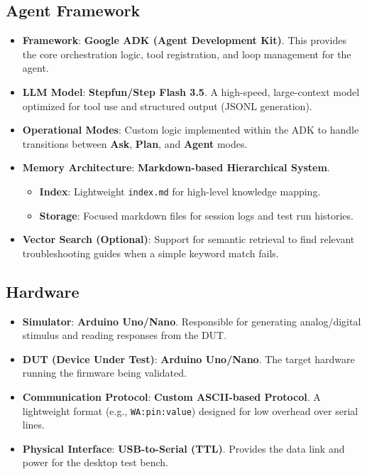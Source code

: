 \documentclass[conference]{IEEEtran}
\begin{document}
\subsection{Agent Framework}
\begin{itemize}
    \item \textbf{Framework}: \textbf{Google ADK (Agent Development Kit)}. This provides the core orchestration logic, tool registration, and loop management for the agent.
    \item \textbf{LLM Model}: \textbf{Stepfun/Step Flash 3.5}. A high-speed, large-context model optimized for tool use and structured output (JSONL generation).
    \item \textbf{Operational Modes}: Custom logic implemented within the ADK to handle transitions between \textbf{Ask}, \textbf{Plan}, and \textbf{Agent} modes.
    \item \textbf{Memory Architecture}: \textbf{Markdown-based Hierarchical System}.
    \begin{itemize}
        \item \textbf{Index}: Lightweight \texttt{index.md} for high-level knowledge mapping.
        \item \textbf{Storage}: Focused markdown files for session logs and test run histories.
    \end{itemize}
    \item \textbf{Vector Search (Optional)}: Support for semantic retrieval to find relevant troubleshooting guides when a simple keyword match fails.
\end{itemize}

\subsection{Hardware}
\begin{itemize}
    \item \textbf{Simulator}: \textbf{Arduino Uno/Nano}. Responsible for generating analog/digital stimulus and reading responses from the DUT.
    \item \textbf{DUT (Device Under Test)}: \textbf{Arduino Uno/Nano}. The target hardware running the firmware being validated.
    \item \textbf{Communication Protocol}: \textbf{Custom ASCII-based Protocol}. A lightweight format (e.g., \texttt{WA:pin:value}) designed for low overhead over serial lines.
    \item \textbf{Physical Interface}: \textbf{USB-to-Serial (TTL)}. Provides the data link and power for the desktop test bench.
\end{itemize}
\end{document}
